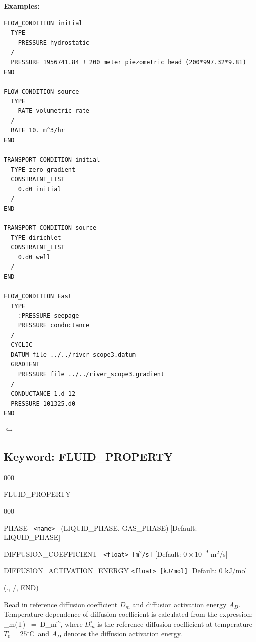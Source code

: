\documentclass[12pt]{article}
\newcommand\return{{\hfill$\hookrightarrow$}}
\def\EQ#1\EN{\begin{equation}#1\end{equation}}
\newcommand{\degc}{$^\circ$C}
\newcommand{\eq}{\ =\ }
\begin{document}
\bigskip

{\noindent\bf Examples:}
\begin{verbatim}
FLOW_CONDITION initial
  TYPE
    PRESSURE hydrostatic
  /
  PRESSURE 1956741.84 ! 200 meter piezometric head (200*997.32*9.81)
END

FLOW_CONDITION source
  TYPE
    RATE volumetric_rate
  /
  RATE 10. m^3/hr
END

TRANSPORT_CONDITION initial
  TYPE zero_gradient
  CONSTRAINT_LIST
    0.d0 initial
  /
END

TRANSPORT_CONDITION source
  TYPE dirichlet
  CONSTRAINT_LIST
    0.d0 well
  /
END

FLOW_CONDITION East
  TYPE
    :PRESSURE seepage
    PRESSURE conductance
  /
  CYCLIC
  DATUM file ../../river_scope3.datum
  GRADIENT
    PRESSURE file ../../river_scope3.gradient
  /
  CONDUCTANCE 1.d-12
  PRESSURE 101325.d0
END
\end{verbatim}

\hyperlink{target_key}{\return}


\newpage
\protect\hypertarget{target_fluid_property}{}

\subsection{Keyword: FLUID\_PROPERTY}


\begin{deflist}{000}
\item[FLUID\_PROPERTY]~
\begin{deflist}{000}
\item[PHASE] \ {\tt <name>} \ (LIQUID\_PHASE, GAS\_PHASE) [Default: LIQUID\_PHASE]
\item[DIFFUSION\_COEFFICIENT] \ {\tt <float> [m$^2$/s]} [Default: $0\times 10^{-9}$ m$^2$/s]
\item[DIFFUSION\_ACTIVATION\_ENERGY] {\tt <float> [kJ/mol]} [Default: 0 kJ/mol]
\end{deflist}
\item[(., /, END)]
\end{deflist}

 Read in reference diffusion coefficient $D_m^\circ$ and diffusion activation energy $A_D$. Temperature dependence of diffusion coefficient is calculated from the expression:
\EQ
D_m(T) \eq D_m^\circ\exp{},
\EN
where $D_m^\circ$ is the reference diffusion coefficient at temperature $T_0 = 25$\degc\ and $A_D$ denotes the diffusion activation energy.
\end{document}
